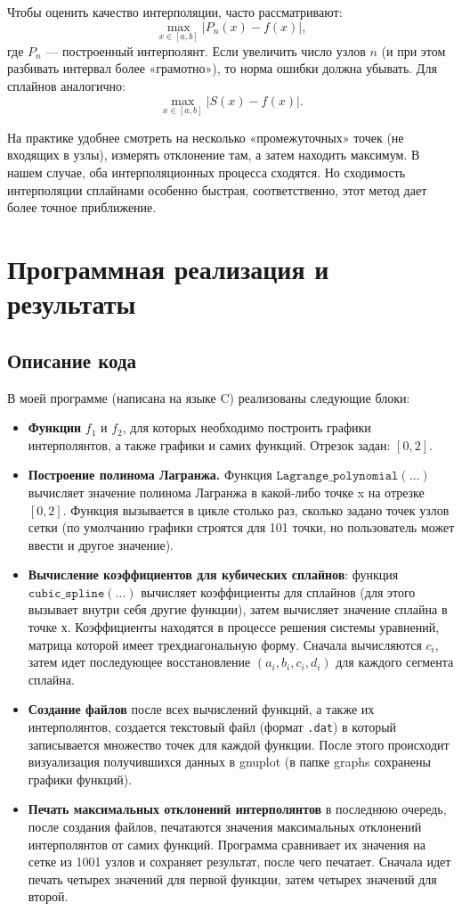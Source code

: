 \documentclass[a4paper, fleqn]{report}
\begin{document}
Чтобы оценить качество интерполяции, часто рассматривают:
\[
\max_{x \in [a, b]} \bigl|P_n(x) - f(x)\bigr|,
\]
где \(P_n\) --- построенный интерполянт. Если увеличить число узлов \(n\) (и при этом разбивать интервал более «грамотно»), то норма ошибки должна убывать. Для сплайнов аналогично:
\[
\max_{x \in [a, b]} |S(x) - f(x)|.
\]

На практике удобнее смотреть на несколько «промежуточных» точек (не входящих в узлы), измерять отклонение там, а затем находить максимум. В нашем случае, оба интерполяционных процесса сходятся. Но сходимость интерполяции сплайнами особенно быстрая, соответственно, этот метод дает более точное приближение.

\chapter{Программная реализация и результаты}

\section*{Описание кода}

В моей программе (написана на языке C) реализованы следующие блоки:
\begin{itemize}
    \item \textbf{Функции} \(f_1\) и \(f_2\), для которых необходимо построить графики интерполянтов, а также графики и самих функций. Отрезок задан: \([0, 2]\).
    \item \textbf{Построение полинома Лагранжа.} Функция \(\texttt{Lagrange\_polynomial}(\dots)\) вычисляет значение полинома Лагранжа в какой-либо точке x на отрезке \([0, 2]\). Функция вызывается в цикле столько раз, сколько задано точек узлов сетки (по умолчанию графики строятся для 101 точки, но пользователь может ввести и другое значение).
    \item \textbf{Вычисление коэффициентов для кубических сплайнов}: функция \(\texttt{cubic\_spline}(\dots)\) вычисляет коэффициенты для сплайнов (для этого вызывает внутри себя другие функции), затем вычисляет значение сплайна в точке х. Коэффициенты находятся в процессе решения системы уравнений, матрица которой имеет трехдиагональную форму. Сначала вычисляются \(c_i\), затем идет последующее восстановление \((a_i, b_i, c_i, d_i)\) для каждого сегмента сплайна.
    \item \textbf{Создание файлов} после всех вычислений функций, а также их интерполянтов, создается текстовый файл (формат \texttt{.dat}) в который записывается множество точек для каждой функции. После этого происходит визуализация получившихся данных в gnuplot (в папке graphs сохранены графики функций).
    \item \textbf{Печать максимальных отклонений интерполянтов} в последнюю очередь, после создания файлов, печатаются значения максимальных отклонений интерполянтов от самих функций. Программа сравнивает их значения на сетке из 1001 узлов и сохраняет результат, после чего печатает. Сначала идет печать четырех значений для первой функции, затем четырех значений для второй.
\end{itemize}
\end{document}
